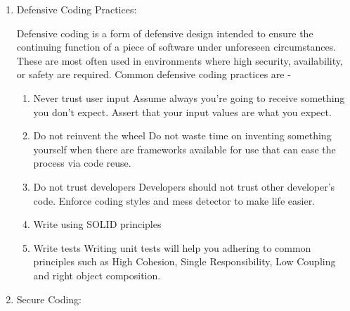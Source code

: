\documentclass{article}
\begin{document}
\begin{enumerate}
    \item Defensive Coding Practices:
    
    Defensive coding is a form of defensive design intended to ensure the continuing function of a piece of software under unforeseen circumstances. These are most often used in environments where high security, availability, or safety are required.
    Common defensive coding practices are - 
    \begin{enumerate}
        \item Never trust user input
        Assume always you’re going to receive something you don’t expect. Assert that your input values are what you expect.
        \item Do not reinvent the wheel
        Do not waste time on inventing something yourself when there are frameworks available for use that can ease the process via code reuse.
        \item Do not trust developers
        Developers should not trust other developer’s code. Enforce coding styles and mess detector to make life easier.
        \item Write using SOLID principles 
        \item Write tests
        Writing unit tests will help you adhering to common principles such as High Cohesion, Single Responsibility, Low Coupling and right object composition.
    \end{enumerate}
    \item Secure Coding:
    

\end{enumerate}
\end{document}
